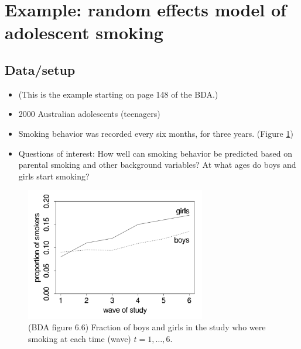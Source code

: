 \documentclass[12pt]{article}
\begin{document}
\section{Example: random effects model of adolescent smoking}

\subsection*{Data/setup}
\begin{itemize}
\item (This is the example starting on page 148 of the BDA.)
\item 2000 Australian adolescents (teenagers)
\item Smoking behavior was recorded every six months, for three years. (Figure \ref{figure:smoking})
\item Questions of interest: How well can smoking behavior be predicted based on parental smoking and other background variables? At what ages do boys and girls start smoking?
\end{itemize}

\begin{figure}
\begin{center}
\includegraphics[width=0.7\textwidth]{smoking.png}
\end{center}
\caption{(BDA figure 6.6) Fraction of boys and girls in the study who were smoking at each time (wave) $t = 1,\ldots,6$.}
\label{figure:smoking}
\end{figure}
\end{document}
